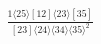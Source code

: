 \documentclass[varwidth, border=5pt]{standalone}
\begin{document}
\begin{my}
$\begin{gathered}
\scriptscriptstyle\frac{1⟨25⟩[12]⟨23⟩[35]}{[23]⟨24⟩⟨34⟩⟨35⟩^2}
\end{gathered}$
\end{my}
\end{document}
